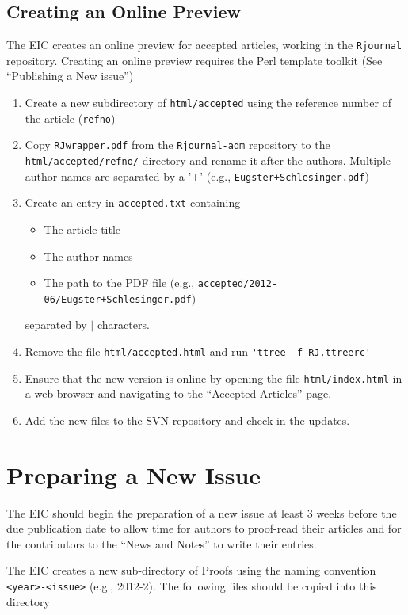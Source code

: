 \documentclass[11pt]{article}
\begin{document}
\subsection{Creating an Online Preview}

The EIC creates an online preview for accepted articles, working
in the \texttt{Rjournal} repository. Creating an online preview
requires the Perl template toolkit (See ``Publishing a New issue'')

\begin{enumerate}
\item Create a new subdirectory of \verb+html/accepted+ using the
  reference number of the article (\verb+refno+)
\item Copy \texttt{RJwrapper.pdf} from the \texttt{Rjournal-adm}
  repository to the \verb+html/accepted/refno/+ directory and rename
  it after the authors. Multiple author names are separated by a '+'
  (e.g., \texttt{Eugster+Schlesinger.pdf})
\item Create an entry in \texttt{accepted.txt} containing 
  \begin{itemize}
  \item The article title
  \item The author names
  \item The path to the PDF file (e.g.,
    \texttt{accepted/2012-06/Eugster+Schlesinger.pdf})
  \end{itemize}
  separated by $|$ characters.
\item Remove the file \verb+html/accepted.html+ and run
  \verb+'ttree -f RJ.ttreerc'+
\item Ensure that the new version is online by opening the file 
\verb+html/index.html+ in a web browser and navigating to the
``Accepted Articles'' page.
\item Add the new files to the SVN repository and check in the updates.
\end{enumerate}

\section{Preparing a New Issue}

The EIC should begin the preparation of a new issue at least 3 weeks
before the due publication date to allow time for authors to proof-read
their articles and for the contributors to the ``News and Notes'' to
write their entries.

The EIC creates a new sub-directory of Proofs using the naming
convention \verb+<year>-<issue>+ (e.g., 2012-2). The following files
should be copied into this directory
\end{document}
